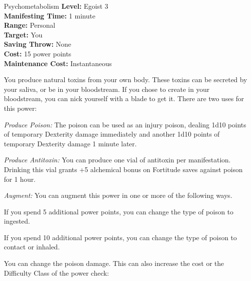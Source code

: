 {Psychometabolism}
{
    \textbf{Level:}
    Egoist 3\\
    \textbf{Manifesting Time:}
    1 minute\\
    \textbf{Range:}
    Personal\\
    \textbf{Target:}
    You\\
    \textbf{Saving Throw:}
    None\\
    \textbf{Cost:}
    15 power points\\
    \textbf{Maintenance Cost:}
    Instantaneous\\
}
{
    You produce natural toxins from your own body. These toxins can be secreted by your saliva, or be in your bloodstream. If you chose to create in your bloodstream, you can nick yourself with a blade to get it. There are two uses for this power:

    \textit{Produce Poison:} The poison can be used as an injury poison, dealing 1d10 points of temporary Dexterity damage immediately and another 1d10 points of temporary Dexterity damage 1 minute later.

    \textit{Produce Antitoxin:} You can produce one vial of antitoxin per manifestation. Drinking this vial grants +5 alchemical bonus on Fortitude saves against poison for 1 hour.

    \textit{Augment:} You can augment this power in one or more of the following ways.
    \begin{enumerate*}
    \item If you spend  5 additional power points, you can change the type of poison to ingested.
    \item If you spend 10 additional power points, you can change the type of poison to contact or inhaled.
    \item You can change the poison damage. This can also increase the cost or the Difficulty Class of the power check:
    \end{enumerate*}

}
